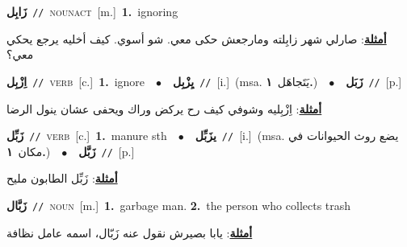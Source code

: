 \documentclass[10pt,a4paper,twoside]{article} %
\begin{document}
\begin{multicols}{2}
{{{{{{{{\setlength\topsep{0pt}\textbf{\foreignlanguage{arabic}{زَابِل}}\ {\color{gray}\texttt{//}\color{black}}\ \textsc{noun\textunderscore act}\ [m.]\ \textbf{1.}~ignoring\  \begin{flushright}\color{gray}\foreignlanguage{arabic}{\textbf{\underline{\foreignlanguage{arabic}{أمثلة}}}: صارلي شهر زابِلته ومارجعش حكى معي. شو أسوي. كيف أخليه يرجع يحكي معي؟}\end{flushright}\color{black}} \vspace{2mm}

{\setlength\topsep{0pt}\textbf{\foreignlanguage{arabic}{اِزْبِل}}\ {\color{gray}\texttt{//}\color{black}}\ \textsc{verb}\ [c.]\ \textbf{1.}~ignore\ \ $\bullet$\ \ \setlength\topsep{0pt}\textbf{\foreignlanguage{arabic}{يِزْبِل}}\ {\color{gray}\texttt{//}\color{black}}\ [i.]\ \color{gray}(msa. \foreignlanguage{arabic}{يَتَجاهَل}~\foreignlanguage{arabic}{\textbf{١.}})\color{black}\ \ $\bullet$\ \ \setlength\topsep{0pt}\textbf{\foreignlanguage{arabic}{زَبَل}}\ {\color{gray}\texttt{//}\color{black}}\ [p.]\  \begin{flushright}\color{gray}\foreignlanguage{arabic}{\textbf{\underline{\foreignlanguage{arabic}{أمثلة}}}: اِزْبِليه وشوفي كيف رح يركض وراك ويحفى عشان ينول الرضا}\end{flushright}\color{black}} \vspace{2mm}

{\setlength\topsep{0pt}\textbf{\foreignlanguage{arabic}{زَبِّل}}\ {\color{gray}\texttt{//}\color{black}}\ \textsc{verb}\ [c.]\ \textbf{1.}~manure sth\ \ $\bullet$\ \ \setlength\topsep{0pt}\textbf{\foreignlanguage{arabic}{يزَبِّل}}\ {\color{gray}\texttt{//}\color{black}}\ [i.]\ \color{gray}(msa. \foreignlanguage{arabic}{يضع روث الحيوانات في مكان}~\foreignlanguage{arabic}{\textbf{١.}})\color{black}\ \ $\bullet$\ \ \setlength\topsep{0pt}\textbf{\foreignlanguage{arabic}{زَبَّل}}\ {\color{gray}\texttt{//}\color{black}}\ [p.]\  \begin{flushright}\color{gray}\foreignlanguage{arabic}{\textbf{\underline{\foreignlanguage{arabic}{أمثلة}}}: زَبِّل الطابون مليح}\end{flushright}\color{black}} \vspace{2mm}

{\setlength\topsep{0pt}\textbf{\foreignlanguage{arabic}{زَبَّال}}\ {\color{gray}\texttt{//}\color{black}}\ \textsc{noun}\ [m.]\ \textbf{1.}~garbage man.  \textbf{2.}~the person who collects trash\  \begin{flushright}\color{gray}\foreignlanguage{arabic}{\textbf{\underline{\foreignlanguage{arabic}{أمثلة}}}: يابا بصيرش نقول عنه زَبّال، اسمه عامل نظافة}\end{flushright}\color{black}} \vspace{2mm}

}}}}}}}
\end{multicols}
\end{document}
